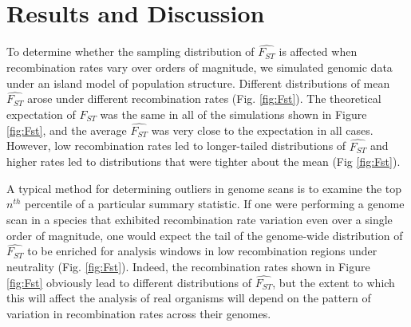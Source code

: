 \documentclass[9pt,twocolumn,twoside]{pnas-new}
\begin{document}





\section*{Results and Discussion}
 
To determine whether the sampling distribution of $\hat{F_{ST}}$ is affected when recombination rates vary over orders of magnitude, we simulated genomic data under an island model of population structure. Different distributions of mean $\hat{F_{ST}}$ arose under different recombination rates (Fig. \ref{fig:Fst}). The theoretical expectation of $F_{ST}$ was the same in all of the simulations shown in Figure \ref{fig:Fst}, and the average $\hat{F_{ST}}$ was very close to the expectation in all cases. However, low recombination rates led to longer-tailed distributions of $\hat{F_{ST}}$ and higher rates led to distributions that were tighter about the mean (Fig \ref{fig:Fst}). 

A typical method for determining outliers in genome scans is to examine the top $n^{th}$ percentile of a particular summary statistic. If one were performing a genome scan in a species that exhibited recombination rate variation even over a single order of magnitude, one would expect the tail of the genome-wide distribution of $\hat{F_{ST}}$ to be enriched for analysis windows in low recombination regions under neutrality (Fig. \ref{fig:Fst}). Indeed, the recombination rates shown in Figure \ref{fig:Fst} obviously lead to different distributions of $\hat{F_{ST}}$, but the extent to which this will affect the analysis of real organisms will depend on the pattern of variation in recombination rates across their genomes.
\end{document}
